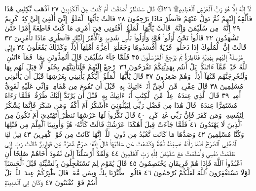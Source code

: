 لَآ إِلَٰهَ إِلَّا هُوَ رَبُّ ٱلْعَرْشِ ٱلْعَظِيمِ۩ ٢٦۞ قَالَ سَنَنظُرُ
أَصَدَقْتَ أَمْ كُنتَ مِنَ ٱلْكَٰذِبِينَ ٢٧ ٱذْهَب بِّكِتَٰبِي هَٰذَا
فَأَلْقِهْ إِلَيْهِمْ ثُمَّ تَوَلَّ عَنْهُمْ فَٱنظُرْ مَاذَا يَرْجِعُونَ ٢٨ قَالَتْ يَٰٓأَيُّهَا
ٱلْمَلَؤُا۟ إِنِّيٓ أُلْقِيَ إِلَيَّ كِتَٰبࣱ كَرِيمٌ ٢٩ إِنَّهُۥ مِن سُلَيْمَٰنَ وَإِنَّهُۥ
قَالَتْ يَٰٓأَيُّهَا ٱلْمَلَؤُا۟ أَفْتُونِي فِيٓ أَمْرِي مَا كُنتُ قَاطِعَةً أَمْرًا حَتَّىٰ
تَشْهَدُونِ ٣٢ قَالُوا۟ نَحْنُ أُو۟لُوا۟ قُوَّةࣲ وَأُو۟لُوا۟ بَأْسࣲ شَدِيدࣲ وَٱلْأَمْرُ
إِلَيْكِ فَٱنظُرِي مَاذَا تَأْمُرِينَ ٣٣ قَالَتْ إِنَّ ٱلْمُلُوكَ إِذَا دَخَلُوا۟ قَرْيَةً
أَفْسَدُوهَا وَجَعَلُوٓا۟ أَعِزَّةَ أَهْلِهَآ أَذِلَّةࣰۚ وَكَذَٰلِكَ يَفْعَلُونَ ٣٤
وَإِنِّي مُرْسِلَةٌ إِلَيْهِم بِهَدِيَّةࣲ فَنَاظِرَةُۢ بِمَ يَرْجِعُ ٱلْمُرْسَلُونَ ٣٥
فَلَمَّا جَآءَ سُلَيْمَٰنَ قَالَ أَتُمِدُّونَنِ بِمَالࣲ فَمَآ ءَاتَىٰنِۦَ ٱللَّهُ خَيْرࣱ مِّمَّآ
ءَاتَىٰكُمۚ بَلْ أَنتُم بِهَدِيَّتِكُمْ تَفْرَحُونَ ٣٦ ٱرْجِعْ إِلَيْهِمْ فَلَنَأْتِيَنَّهُم
بِجُنُودࣲ لَّا قِبَلَ لَهُم بِهَا وَلَنُخْرِجَنَّهُم مِّنْهَآ أَذِلَّةࣰ وَهُمْ صَٰغِرُونَ ٣٧
قَالَ يَٰٓأَيُّهَا ٱلْمَلَؤُا۟ أَيُّكُمْ يَأْتِينِي بِعَرْشِهَا قَبْلَ أَن يَأْتُونِي مُسْلِمِينَ ٣٨
قَالَ عِفْرِيتࣱ مِّنَ ٱلْجِنِّ أَنَا۠ ءَاتِيكَ بِهِۦ قَبْلَ أَن تَقُومَ مِن مَّقَامِكَۖ
وَإِنِّي عَلَيْهِ لَقَوِيٌّ أَمِينࣱ ٣٩ قَالَ ٱلَّذِي عِندَهُۥ عِلْمࣱ مِّنَ ٱلْكِتَٰبِ أَنَا۠
ءَاتِيكَ بِهِۦ قَبْلَ أَن يَرْتَدَّ إِلَيْكَ طَرْفُكَۚ فَلَمَّا رَءَاهُ مُسْتَقِرًّا عِندَهُۥ
قَالَ هَٰذَا مِن فَضْلِ رَبِّي لِيَبْلُوَنِيٓ ءَأَشْكُرُ أَمْ أَكْفُرُۖ وَمَن شَكَرَ فَإِنَّمَا
يَشْكُرُ لِنَفْسِهِۦۖ وَمَن كَفَرَ فَإِنَّ رَبِّي غَنِيࣱّ كَرِيمࣱ ٤٠ قَالَ نَكِّرُوا۟ لَهَا
عَرْشَهَا نَنظُرْ أَتَهْتَدِيٓ أَمْ تَكُونُ مِنَ ٱلَّذِينَ لَا يَهْتَدُونَ ٤١ فَلَمَّا
جَآءَتْ قِيلَ أَهَٰكَذَا عَرْشُكِۖ قَالَتْ كَأَنَّهُۥ هُوَۚ وَأُوتِينَا ٱلْعِلْمَ مِن قَبْلِهَا
وَكُنَّا مُسْلِمِينَ ٤٢ وَصَدَّهَا مَا كَانَت تَّعْبُدُ مِن دُونِ ٱللَّهِۖ إِنَّهَا كَانَتْ مِن
قَوْمࣲ كَٰفِرِينَ ٤٣ قِيلَ لَهَا ٱدْخُلِي ٱلصَّرْحَۖ فَلَمَّا رَأَتْهُ حَسِبَتْهُ لُجَّةࣰ
وَكَشَفَتْ عَن سَاقَيْهَاۚ قَالَ إِنَّهُۥ صَرْحࣱ مُّمَرَّدࣱ مِّن قَوَارِيرَۗ قَالَتْ رَبِّ
إِنِّي ظَلَمْتُ نَفْسِي وَأَسْلَمْتُ مَعَ سُلَيْمَٰنَ لِلَّهِ رَبِّ ٱلْعَٰلَمِينَ ٤٤
وَلَقَدْ أَرْسَلْنَآ إِلَىٰ ثَمُودَ أَخَاهُمْ صَٰلِحًا أَنِ ٱعْبُدُوا۟ ٱللَّهَ
فَإِذَا هُمْ فَرِيقَانِ يَخْتَصِمُونَ ٤٥ قَالَ يَٰقَوْمِ لِمَ تَسْتَعْجِلُونَ
بِٱلسَّيِّئَةِ قَبْلَ ٱلْحَسَنَةِۖ لَوْلَا تَسْتَغْفِرُونَ ٱللَّهَ لَعَلَّكُمْ
تُرْحَمُونَ ٤٦ قَالُوا۟ ٱطَّيَّرْنَا بِكَ وَبِمَن مَّعَكَۚ قَالَ طَٰٓئِرُكُمْ
عِندَ ٱللَّهِۖ بَلْ أَنتُمْ قَوْمࣱ تُفْتَنُونَ ٤٧ وَكَانَ فِي ٱلْمَدِينَةِ
